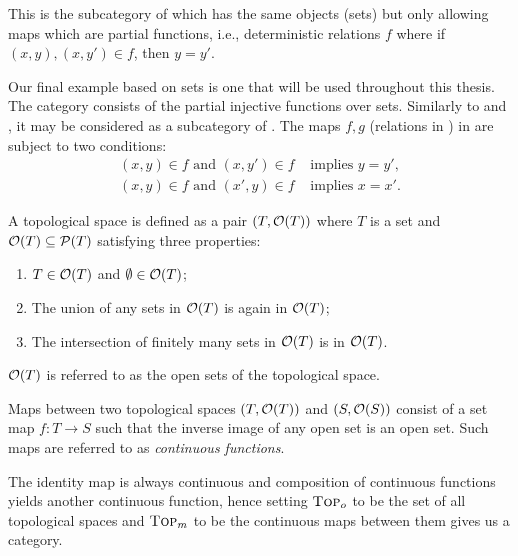 \begin{example}[\Par]\label{ex:category_par}
This is the subcategory of \rel which has the same  objects (sets) but only allowing maps which are
partial functions, i.e., deterministic relations $f$ where if $(x,y), (x,y') \in f$, then $y = y'$.
\end{example}


\begin{example}[\pinj]\label{ex:category_pinj}
Our final example based on sets is one that will be used throughout this thesis. The category \pinj consists of
the partial injective functions over sets. Similarly to \sets and \Par, it may be considered as a subcategory
of \rel. The maps $f,g$ (relations in \rel) in \pinj are subject to two conditions:
\begin{align}
   (x,y)\in f\text{ and }(x,y')\in f & \text{ implies } y = y',\label{eq:pinj_relation_is_a_function}\\
   (x,y)\in f\text{ and }(x',y)\in f & \text{ implies } x = x'.\label{eq:pinj_converse_relation_is_a_function}
\end{align}
\end{example}

\begin{example}[\topcat]\label{ex:category_top}
  A topological space is defined as a pair $(T,\mathcal{O}({T}))$ where $T$ is a set and $\mathcal{O}({T}) \subseteq
  \mathcal{P}(T)$ satisfying three properties:
  \begin{enumerate}[{(}i{)}]
    \item $T\in \mathcal{O}({T})$ and $\emptyset \in \mathcal{O}({T})$;
    \item The union of any sets in $\mathcal{O}({T})$ is again in $\mathcal{O}({T})$;
    \item The intersection of finitely many sets in $\mathcal{O}({T})$ is in $\mathcal{O}({T})$.
  \end{enumerate}
  $\mathcal{O}({T})$ is referred to as the open sets of the topological space.

  Maps between two topological spaces $(T,\mathcal{O}({T}))$ and $(S,\mathcal{O}({S}))$ consist of
  a set map $f:T \to S$ such that the inverse image of any open set  is an open set. Such
  maps are referred to as \emph{continuous functions}.

  The identity map is always continuous and composition of continuous functions yields another
  continuous function, hence setting $\textsc{Top}_o$ to be the set of all topological spaces and
  $\textsc{Top}_m$ to be the continuous maps between them gives us a category.
\end{example}

